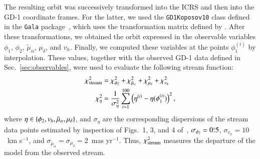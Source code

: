 \documentclass[twocolumn]{aa}
\begin{document}
The resulting orbit was successively transformed into the ICRS and then into the GD-1 coordinate frames. For the latter, we used the \texttt{GD1Koposov10} class defined in the \texttt{Gala} package~\citep{gala,adrian_price_whelan_2020_4159870}, which uses the transformation matrix defined by \citet{Koposov_2010}.
After these transformations, we obtained the orbit expressed in the observable variables $\phi_1$, $\phi_2$, $\tilde{\mu}_\alpha$, $\mu_\delta$, and $v_h$. Finally, we computed these variables at the points $\phi_1^{(i)}$ by interpolation. These values, together with the observed GD-1 data defined in Sec.~\ref{sec:observables}, were used to evaluate the following stream function:
\begin{align}
   \label{chi2:stream}
   \chi^2_{\rm{stream}} &= \chi^2_{\phi_2} + \chi^2_{\tilde{\mu}_\alpha}+ \chi^2_{\mu_\delta}+\chi^2_{v_h}\\
   \label{chi2:component}
   \chi^2_{\eta} &= \frac{1}{\sigma_\eta^2}\sum_{i=1}^{100} \left(\eta^{(i)}-\eta(\phi_1^{(i)})\right)^2,
\end{align}
where
$\eta\in\left\{\phi_2, v_h, \tilde{\mu}_\alpha, \mu_\delta\right\}$, and $\sigma_\eta$ are the corresponding dispersions of the stream data points estimated by inspection of Figs.~1, 3, and 4 of~\citet{Ibata_2020},
$\sigma_{\phi_2}=0\overset{\circ}{.} 5$,
$\sigma_{v_h} = 10$~km s$^{-1}$, and
$\sigma_{\tilde{\mu}_\alpha}= \sigma_{\mu_\delta}= 2$~mas yr$^{-1}$.
Thus, $\chi^2_{\rm{stream}}$ measures the departure of the model from the observed stream.
\end{document}
